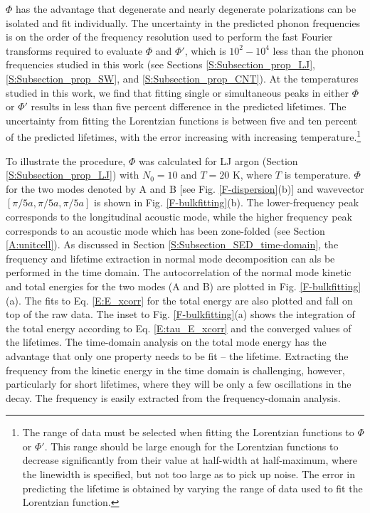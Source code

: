 $\Phi$ has the advantage that degenerate and nearly degenerate 
polarizations can be isolated and fit individually. The uncertainty 
in the predicted phonon frequencies is 
on the order of the frequency resolution used to perform the fast 
Fourier transforms required to evaluate $\Phi$ and $\Phi'$, which is 
$10^2-10^4$ less than the phonon frequencies 
studied in this work (see Sections \ref{S:Subsection_prop_LJ}, 
\ref{S:Subsection_prop_SW}, 
and \ref{S:Subsection_prop_CNT}). At the temperatures studied in this work, 
we find that 
fitting single or simultaneous peaks in either $\Phi$ or $\Phi'$ results 
in less than five 
percent difference in the predicted lifetimes. The uncertainty from 
fitting the Lorentzian 
functions is between five and ten percent of the predicted lifetimes, 
with the error increasing 
with increasing temperature.\footnote{The range of data must be 
selected when fitting the 
Lorentzian functions to $\Phi$ or $\Phi'$. This range should be large 
enough for the Lorentzian 
functions to decrease significantly from their value at
half-width at half-maximum, where the linewidth is specified, but not 
too large as to pick up 
noise. The error in predicting the lifetime is obtained by varying the 
range of data
used to fit the Lorentzian function.}

To illustrate the procedure, $\Phi$ was calculated for LJ argon (Section 
\ref{S:Subsection_prop_LJ}) with $N_0=10$ and $T=20$ K, where $T$ is 
temperature. $\Phi$ for the two modes denoted by A and B 
[see Fig. \ref{F-dispersion}(b)] 
and wavevector $[\pi/5a,\pi/5a,\pi/5a]$ 
is shown in Fig$.$ \ref{F-bulkfitting}(b). The lower-frequency peak 
corresponds to the longitudinal acoustic mode,
\cite{dove_introduction_1993} while the higher 
frequency peak corresponds to an acoustic mode which has been 
zone-folded (see Section \ref{A:unitcell}). 
As discussed in Section \ref{S:Subsection_SED_time-domain}, the frequency 
and lifetime extraction in normal mode decomposition can als be performed 
in the time domain. The autocorrelation of the normal 
mode kinetic and total energies for the two modes (A and B) 
are plotted in Fig. \ref{F-bulkfitting}(a). The fits to 
Eq. \eqref{E:E_xcorr} for the total energy are also plotted and 
fall on top of the raw data.  The inset to Fig. \ref{F-bulkfitting}(a) 
shows the integration of the total energy according to 
Eq. \eqref{E:tau_E_xcorr} and the converged values of the lifetimes. 
The time-domain analysis on the total mode 
energy has the advantage that only one property needs to be fit -- 
the lifetime. Extracting the frequency from the kinetic energy in the 
time domain is challenging, however, particularly for short lifetimes, 
where they will be only a few oscillations in the decay. The frequency 
is easily extracted from the frequency-domain analysis.

